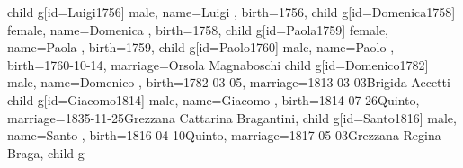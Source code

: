 \documentclass{article}
\begin{document}
\begin{midpage}
\begin{center}
\begin{genealogypicture}
{{{{{{{                        }
                        child{
                            g[id=Luigi1756]{
                                male,
                                name={Luigi },
                                birth={1756}{},
                            }
                        }
                        child{
                            g[id=Domenica1758]{
                                female,
                                name={Domenica },
                                birth={1758}{},
                            }
                        }
                        child{
                            g[id=Paola1759]{
                                female,
                                name={Paola },
                                birth={1759}{},
                            }
                        }
                        child{
                            g[id=Paolo1760]{
                                male,
                                name={Paolo },
                                birth={1760-10-14}{},
                                marriage={Orsola Magnaboschi}{}
                            }
                            child{
                                g[id=Domenico1782]{
                                    male,
                                    name={Domenico },
                                    birth={1782-03-05}{},
                                    marriage={1813-03-03}{Brigida Accetti}
                                }
                                child{
                                    g[id=Giacomo1814]{
                                        male,
                                        name={Giacomo },
                                        birth={1814-07-26}{Quinto},
                                        marriage={1835-11-25}{Grezzana \newline Cattarina Bragantini},
                                    }
                                }
                                child{
                                    g[id=Santo1816]{
                                        male,
                                        name={Santo },
                                        birth={1816-04-10}{Quinto},
                                        marriage={1817-05-03}{Grezzana \newline Regina Braga},
                                    }
                                    child{
                                        g{
}}}}}}}}}}}
\end{genealogypicture}
\end{center}
\end{midpage}
\end{document}
